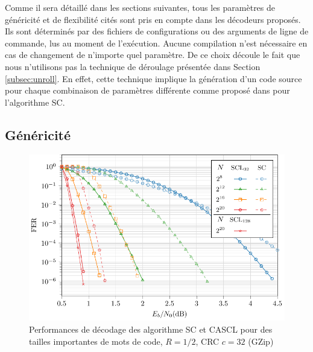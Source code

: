 Comme il sera détaillé dans les sections suivantes, tous les paramètres de généricité et de flexibilité cités sont pris en compte dans les décodeurs proposés. Ils sont déterminés par des fichiers de configurations ou des arguments de ligne de commande, lus au moment de l'exécution. Aucune compilation n'est nécessaire en cas de changement de n'importe quel paramètre. De ce choix découle le fait que nous n'utilisons pas la technique de déroulage présentée dans Section \ref{subsec:unroll}. En effet, cette technique implique la génération d'un code source pour chaque combinaison de paramètres différente comme proposé dans \cite{sarkis_autogenerating_2014} pour l'algorithme SC.

\subsection{Généricité}

\begin{figure}[t]
\includegraphics[width=\textwidth]{main/ch2_fig/curves/code/tikz/code}
\caption{Performances de décodage des algorithme SC et CASCL pour des tailles importantes de mots de code, $R=1/2$, CRC $c=32$ (GZip)}
\label{fig:large_scl}
\end{figure}

